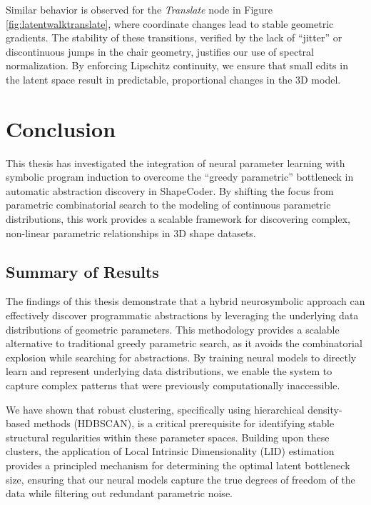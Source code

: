 \documentclass{thesis}
\begin{document}
Similar behavior is observed for the \textit{Translate} node in Figure \ref{fig:latentwalktranslate}, where coordinate changes lead to stable geometric gradients. The stability of these transitions, verified by the lack of ``jitter'' or discontinuous jumps in the chair geometry, justifies our use of spectral normalization. By enforcing Lipschitz continuity, we ensure that small edits in the latent space result in predictable, proportional changes in the 3D model.



\chapter{Conclusion}\label{ch:conclusion}

This thesis has investigated the integration of neural parameter learning with symbolic program induction to overcome the ``greedy parametric'' bottleneck in automatic abstraction discovery in ShapeCoder. By shifting the focus from parametric combinatorial search to the modeling of continuous parametric distributions, this work provides a scalable framework for discovering complex, non-linear parametric relationships in 3D shape datasets.

\section{Summary of Results}

The findings of this thesis demonstrate that a hybrid neurosymbolic approach can effectively discover programmatic abstractions by leveraging the underlying data distributions of geometric parameters. This methodology provides a scalable alternative to traditional greedy parametric search, as it avoids the combinatorial explosion while searching for abstractions. By training neural models to directly learn and represent underlying data distributions, we enable the system to capture complex patterns that were previously computationally inaccessible.

We have shown that robust clustering, specifically using hierarchical density-based methods (HDBSCAN), is a critical prerequisite for identifying stable structural regularities within these parameter spaces. Building upon these clusters, the application of Local Intrinsic Dimensionality (LID) estimation provides a principled mechanism for determining the optimal latent bottleneck size, ensuring that our neural models capture the true degrees of freedom of the data while filtering out redundant parametric noise. 
\end{document}
